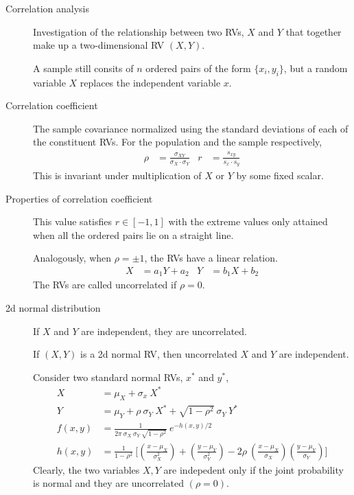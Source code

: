 \begin{description}
    \item[Correlation analysis] Investigation of the relationship between two RVs, $ X $
          and $ Y $ that together make up a two-dimensional RV $ (X, Y) $. \par
          A sample still consits of $ n $ ordered pairs of the form $ \{x_i, y_i\} $,
          but a random variable $ X $ replaces the independent variable $ x $.

    \item[Correlation coefficient] The sample covariance normalized using the standard
          deviations of each of the constituent RVs. For the population and the sample
          respectively,
          \begin{align}
              \rho & = \frac{\sigma_{XY}}{\sigma_X \cdot \sigma_Y} &
              r    & = \frac{s_{xy}}{s_x \cdot s_y}
          \end{align}
          This is invariant under multiplication of $ X $ or $ Y $ by some fixed scalar.
          \par
    \item[Properties of correlation coefficient] This value satisfies $ r \in [-1,1] $
          with the extreme values only attained when all the ordered pairs lie on
          a straight line. \par
          Analogously, when $ \rho = \pm 1 $, the RVs have a linear relation.
          \begin{align}
              X & = a_1Y + a_2 & Y & = b_1X + b_2
          \end{align}
          The RVs are called uncorrelated if $ \rho = 0 $.

    \item[2d normal distribution] If $ X $ and $ Y $ are independent, they are
          uncorrelated. \par
          If $ (X, Y) $ is a 2d normal RV, then uncorrelated $ X $ and $ Y $
          are independent. \par
          Consider two standard normal RVs, $ x^* $ and $ y^* $,
          \begin{align}
              X       & = \mu_X + \sigma_x\ X^*                                 \\
              Y       & = \mu_Y + \rho\ \sigma_Y\ X^* + \sqrt{1 - \rho^2}
              \ \sigma_Y\ Y^*                                                   \\
              f(x, y) & = \frac{1}{2\pi\ \sigma_X\ \sigma_Y\ \sqrt{1 - \rho^2}}
              \ e^{-h(x, y)/2}                                                  \\
              h(x, y) & = \frac{1}{1  -\rho^2}\ \Bigg[\left( \frac{x - \mu_X}
                  {\sigma_X^2} \right) + \left( \frac{y - \mu_Y}
                  {\sigma_Y^2} \right) - 2\rho\ \left( \frac{x - \mu_X}
                  {\sigma_X} \right)\left( \frac{y - \mu_Y}
                  {\sigma_Y} \right)\Bigg]
          \end{align}
          Clearly, the two variables $ X, Y $ are indepedent only if the joint
          probability is normal and they are uncorrelated $(\rho = 0)$.


\end{description}
